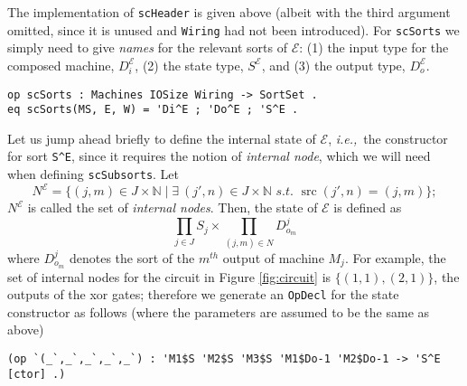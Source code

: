 \documentclass[copyright,creativecommons]{eptcs}
\newcommand{\ie}{\textit{i.e.,}}
\newcommand{\E}{\mathcal{E}}
\newcommand{\N}{\mathbb{N}}
\DeclareMathOperator{\src}{src}
\begin{document}
The implementation of {\tt scHeader} is given above (albeit with the third
argument omitted, since it is unused and {\tt Wiring} had not been introduced).
For {\tt scSorts} we simply need to give \emph{names} for the relevant sorts of
$\E$: (1) the input type for the composed machine, $D^{\E}_i$, (2) the state
type, $S^{\E}$, and (3) the output type, $D^{\E}_o$.

\begin{center}
\begin{small}
\begin{boxedminipage}{0.60\textwidth}
\begin{verbatim}
op scSorts : Machines IOSize Wiring -> SortSet .
eq scSorts(MS, E, W) = 'Di^E ; 'Do^E ; 'S^E .
\end{verbatim}
\end{boxedminipage}
\end{small}
\end{center}

Let us jump ahead briefly to define the internal state of $\E$, \ie\ the
constructor for sort {\tt S\^{}E}, since it requires the notion of
\emph{internal node}, which we will need when defining {\tt scSubsorts}.
Let 
\begin{equation*}
N^{\E} = \{(j,m) \in J \times \N \mid \textit{$\exists \ (j',n) \in J \times \N$ s.t. $\src(j',n) = (j,m)$}\};
\end{equation*}
$N^{\E}$ is called the set of \emph{internal nodes}. Then, the state of $\E$ is
defined as
\begin{equation*}
\prod_{j \in J} S_j \times \prod_{(j,m) \in N} D^{j}_{o_{m}}
\end{equation*}
where $D^{j}_{o_{m}}$ denotes the sort of the $m^{th}$ output of machine $M_j$.
For example, the set of internal nodes for the circuit in Figure
\ref{fig:circuit} is $\{(1,1), (2,1)\}$, the outputs of the xor gates;
therefore we generate an {\tt OpDecl} for the state constructor as follows
(where the parameters are assumed to be the same as above)

\begin{center}
\begin{small}
\begin{boxedminipage}{0.95\textwidth}
\begin{verbatim}
(op `(_`,_`,_`,_`,_`) : 'M1$S 'M2$S 'M3$S 'M1$Do-1 'M2$Do-1 -> 'S^E [ctor] .)
\end{verbatim}
\end{boxedminipage}
\end{small}
\end{center}
\end{document}

